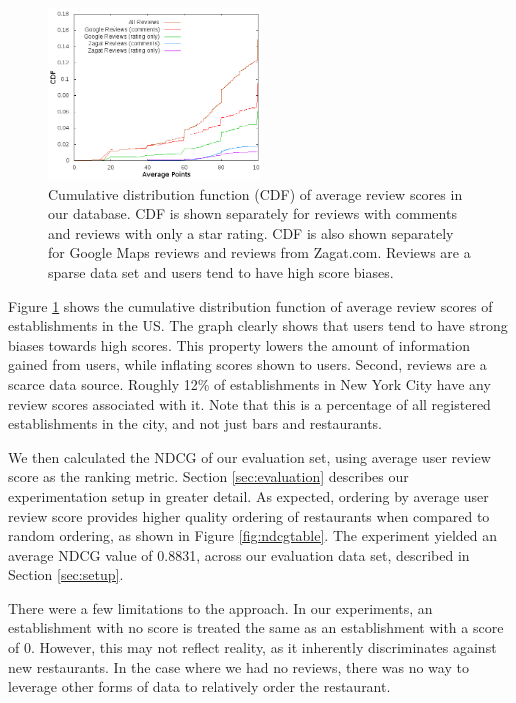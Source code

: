 \begin{figure}
  \includegraphics[width=0.5\textwidth]{fig/graph-avgpoints2.png}
  \caption{Cumulative distribution function (CDF) of average review scores in our database.
  CDF is shown separately for reviews with comments and reviews with only a star rating.
  CDF is also shown separately for Google Maps reviews and reviews from Zagat.com.
  Reviews are a sparse data set and users tend to have high score biases.}
  \label{fig:reviewscoredistribution}
\end{figure}

Figure \ref{fig:reviewscoredistribution} shows the cumulative 
distribution function of average review scores of establishments in the US.
The graph clearly shows that users tend to have strong biases towards high scores.
This property lowers the amount of information gained from users, while inflating scores shown to users.
Second, reviews are a scarce data source.
Roughly 12\% of establishments in New York City have any review scores associated with it.
Note that this is a percentage of all registered establishments in the city,
and not just bars and restaurants.

We then calculated the NDCG of our evaluation set,
using average user review score as the ranking metric.
Section \ref{sec:evaluation} describes our experimentation setup in greater detail.
As expected, ordering by average user review score provides
higher quality ordering of restaurants when compared to random ordering,
as shown in Figure \ref{fig:ndcgtable}.
The experiment yielded an average NDCG value of 0.8831,
across our evaluation data set, described in Section \ref{sec:setup}.

There were a few limitations to the approach.
In our experiments, an establishment with no score is treated 
the same as an establishment with a score of 0.
However, this may not reflect reality, as it inherently 
discriminates against new restaurants.
In the case where we had no reviews, there was no way to leverage other
forms of data to relatively order the restaurant.

